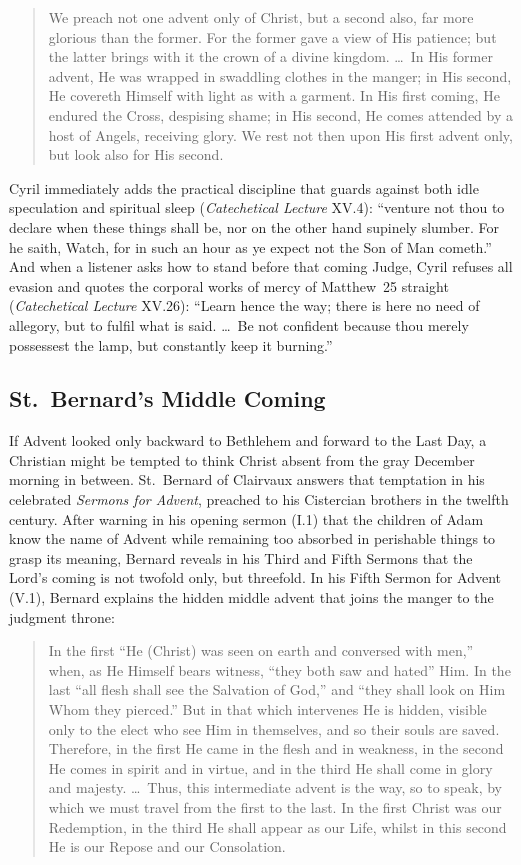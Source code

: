 \begin{quote}
We preach not one advent only of Christ, but a second also, far more glorious than the former. For the former gave a view of His patience; but the latter brings with it the crown of a divine kingdom. \dots\ In His former advent, He was wrapped in swaddling clothes in the manger; in His second, He covereth Himself with light as with a garment. In His first coming, He endured the Cross, despising shame; in His second, He comes attended by a host of Angels, receiving glory. We rest not then upon His first advent only, but look also for His second.
\end{quote}

Cyril immediately adds the practical discipline that guards against both idle speculation and spiritual sleep (\textit{Catechetical Lecture} XV.4): ``venture not thou to declare when these things shall be, nor on the other hand supinely slumber. For he saith, Watch, for in such an hour as ye expect not the Son of Man cometh.'' And when a listener asks how to stand before that coming Judge, Cyril refuses all evasion and quotes the corporal works of mercy of Matthew~25 straight (\textit{Catechetical Lecture} XV.26): ``Learn hence the way; there is here no need of allegory, but to fulfil what is said. \dots\ Be not confident because thou merely possessest the lamp, but constantly keep it burning.''

\subsection{St.~Bernard's Middle Coming}

If Advent looked only backward to Bethlehem and forward to the Last Day, a Christian might be tempted to think Christ absent from the gray December morning in between. St.~Bernard of Clairvaux answers that temptation in his celebrated \textit{Sermons for Advent}, preached to his Cistercian brothers in the twelfth century. After warning in his opening sermon (I.1) that the children of Adam know the name of Advent while remaining too absorbed in perishable things to grasp its meaning, Bernard reveals in his Third and Fifth Sermons that the Lord's coming is not twofold only, but threefold. In his Fifth Sermon for Advent (V.1), Bernard explains the hidden middle advent that joins the manger to the judgment throne:

\begin{quote}
In the first ``He (Christ) was seen on earth and conversed with men,'' when, as He Himself bears witness, ``they both saw and hated'' Him. In the last ``all flesh shall see the Salvation of God,'' and ``they shall look on Him Whom they pierced.'' But in that which intervenes He is hidden, visible only to the elect who see Him in themselves, and so their souls are saved. Therefore, in the first He came in the flesh and in weakness, in the second He comes in spirit and in virtue, and in the third He shall come in glory and majesty. \dots\ Thus, this intermediate advent is the way, so to speak, by which we must travel from the first to the last. In the first Christ was our Redemption, in the third He shall appear as our Life, whilst in this second He is our Repose and our Consolation.
\end{quote}

